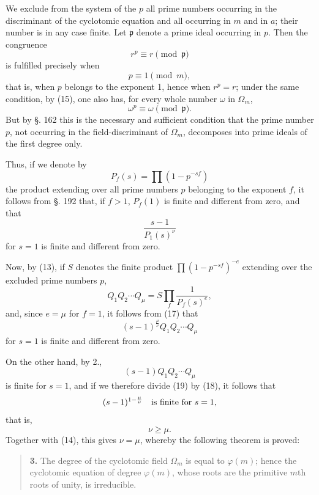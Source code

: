 \documentclass[11pt]{article}
\begin{document}
We exclude from the system of the $p$ all prime numbers occurring in the discriminant of the cyclotomic equation and all occurring in $m$ and in $a$; their number is in any case finite. Let $\mathfrak p$ denote a prime ideal occurring in $p$. Then the congruence
\[
r^p\equiv r \pmod{\mathfrak p}
\]
is fulfilled precisely when
\begin{equation}\tag{16}
p\equiv1 \pmod m,
\end{equation}
that is, when $p$ belongs to the exponent 1, hence when $r^p=r$; under the same condition, by (15), one also has, for every whole number $\omega$ in $\Omega_m$,
\[
\omega^p\equiv\omega \pmod{\mathfrak p}.
\]
But by §. 162 this is the necessary and sufficient condition that the prime number $p$, not occurring in the field-discriminant of $\Omega_m$, decomposes into prime ideals of the first degree only.

Thus, if we denote by
\[
P_f(s)=\prod (1-p^{-sf})
\]
the product extending over all prime numbers $p$ belonging to the exponent $f$, it follows from §. 192 that, if $f>1$, $P_f(1)$ is finite and different from zero, and that
\begin{equation}\tag{17}
\frac{s-1}{P_1(s)^\nu}
\end{equation}
for $s=1$ is finite and different from zero.

Now, by (13), if $S$ denotes the finite product $\prod(1-p^{-sf})^{-e}$ extending over the excluded prime numbers $p$,
\[
Q_1Q_2\cdots Q_\mu=S\prod_f\frac{1}{P_f(s)^e},
\]
and, since $e=\mu$ for $f=1$, it follows from (17) that
\begin{equation}\tag{18}
(s-1)^{\frac{\mu}{\nu}}Q_1Q_2\cdots Q_\mu
\end{equation}
for $s=1$ is finite and different from zero.

On the other hand, by 2.,
\begin{equation}\tag{19}
(s-1)Q_1Q_2\cdots Q_\mu
\end{equation}
is finite for $s=1$, and if we therefore divide (19) by (18), it follows that
\[
(s-1)^{1-\frac{\mu}{\nu}}\quad\hbox{is finite for }s=1,
\]
that is,
\begin{equation}\tag{20}
\nu\geq\mu.
\end{equation}
Together with (14), this gives $\nu=\mu$, whereby the following theorem is proved:

\begin{quote}
\textbf{3.} The degree of the cyclotomic field $\Omega_m$ is equal to $\varphi(m)$; hence the cyclotomic equation of degree $\varphi(m)$, whose roots are the primitive $m$th roots of unity, is irreducible.
\end{quote}
\end{document}
